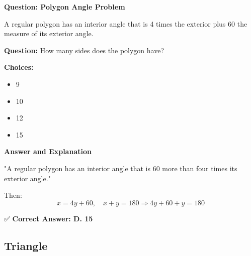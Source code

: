 \documentclass{beamer}
\begin{document}
\begin{frame}{\textbf{Question: Polygon Angle Problem}}
\small

A regular polygon has an interior angle that is 4 times the exterior plus 60 the measure of its exterior angle. 

\vspace{0.3cm}
\textbf{Question:}  
How many sides does the polygon have?

\vspace{0.4cm}
\textbf{Choices:}
\begin{itemize}
    \item[A.] 9
    \item[B.] 10
    \item[C.] 12
    \item[D.] 15
\end{itemize}

\end{frame}
\begin{frame}{\textbf{Answer and Explanation}}



"A regular polygon has an interior angle that is 60 more than four times its exterior angle."

Then:
\[
x = 4y + 60,\quad x + y = 180
\Rightarrow 4y + 60 + y = 180

\]

✅ \textbf{Correct Answer: D. 15}

\end{frame}



\begin{frame}
\section{Triangle}
\end{frame}
\end{document}

